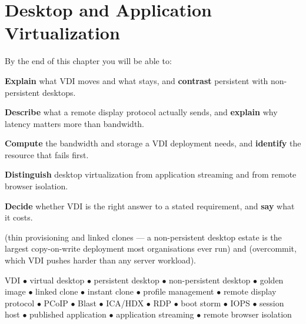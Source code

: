 \chapter{Desktop and Application Virtualization}\label{ch:desktop}

\begin{outcomes}
By the end of this chapter you will be able to:
\begin{tight}
  \item \textbf{Explain} what VDI moves and what stays, and \textbf{contrast}
        persistent with non-persistent desktops.
  \item \textbf{Describe} what a remote display protocol actually sends, and
        \textbf{explain} why latency matters more than bandwidth.
  \item \textbf{Compute} the bandwidth and storage a VDI deployment needs, and
        \textbf{identify} the resource that fails first.
  \item \textbf{Distinguish} desktop virtualization from application streaming
        and from remote browser isolation.
  \item \textbf{Decide} whether VDI is the right answer to a stated
        requirement, and \textbf{say} what it costs.
\end{tight}
\end{outcomes}

\begin{prereq}
 (thin provisioning and linked clones --- a non-persistent
desktop estate is the largest copy-on-write deployment most organisations ever
run) and  (overcommit, which VDI pushes harder than any server
workload).
\end{prereq}

\begin{keyterms}
VDI $\bullet$ virtual desktop $\bullet$ persistent desktop $\bullet$
non-persistent desktop $\bullet$ golden image $\bullet$ linked clone $\bullet$
instant clone $\bullet$ profile management $\bullet$ remote display protocol
$\bullet$ PCoIP $\bullet$ Blast $\bullet$ ICA/HDX $\bullet$ RDP $\bullet$
boot storm $\bullet$ IOPS $\bullet$ session host $\bullet$ published
application $\bullet$ application streaming $\bullet$ remote browser isolation
\end{keyterms}

